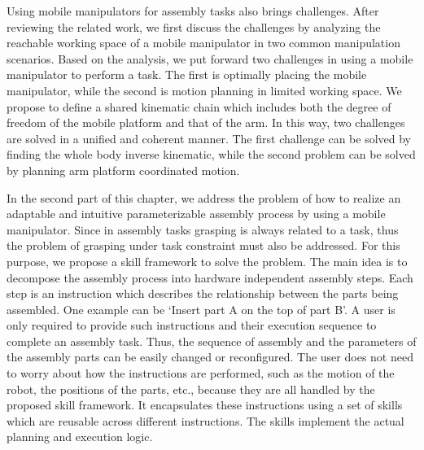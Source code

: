 Using mobile manipulators for assembly tasks also brings challenges. After reviewing the related work, we first discuss the challenges by analyzing the reachable working space of a mobile manipulator in two common manipulation scenarios. Based on the analysis, we put forward two challenges in using a mobile manipulator to perform a task. The first is optimally placing the mobile manipulator, while the second is motion planning in limited working space. We propose to define a shared kinematic chain which includes both the degree of freedom of the mobile platform and that of the arm. In this way, two challenges are solved in a unified and coherent manner. The first challenge can be solved by finding the whole body inverse kinematic, while the second problem can be solved by planning arm platform coordinated motion.  

In the second part of this chapter, we address the problem of how to realize an adaptable and intuitive parameterizable assembly process by using a mobile manipulator. Since in assembly tasks grasping is always related to a task, thus the problem of grasping under task constraint must also be addressed. For this purpose, we propose a skill framework to solve the problem. The main idea is to decompose the assembly process into hardware independent assembly steps. Each step is an instruction which describes the relationship between the parts being assembled. One example can be `Insert part A on the top of part B'. A user is only required to provide such instructions and their execution sequence to complete an assembly task. Thus, the sequence of assembly and the parameters of the assembly parts can be easily changed or reconfigured. The user does not need to worry about how the instructions are performed, such as the motion of the robot, the positions of the parts, etc., because they are all handled by the proposed skill framework. It encapsulates these instructions using a set of skills which are reusable across different instructions. The skills implement the actual planning and execution logic. 

